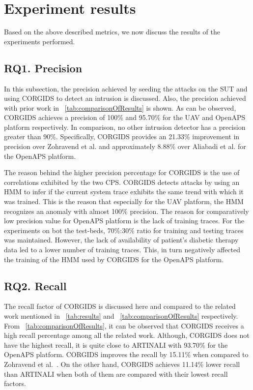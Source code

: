 \section{Experiment results} 
Based on the above described metrics, we now discuss the results of the experiments performed.

\subsection{RQ1. Precision}
In this subsection, the precision achieved by seeding the attacks on the SUT and using CORGIDS to detect an intrusion is discussed. Also,  the precision achieved with prior work in  ~\autoref{tab:comparisonOfResults} is shown. As can be observed, CORGIDS achieves a precision of 100\% and 95.70\% for the UAV and OpenAPS platform respectively. In comparison, no other intrusion detector has a precision greater than 90\%. Specifically, CORGIDS provides an 21.33\% improvement in precision over Zohravend et al. \cite{zohrevand2016hidden} and approximately 8.88\% over Aliabadi et al. \cite{aliabadi2017artinali} for the OpenAPS platform.

The reason behind the higher precision percentage for CORGIDS is the use of correlations exhibited by the two CPS. CORGIDS detects attacks by using an HMM to infer if the current system trace exhibits the same trend with which it was trained. This is the reason that especially for the UAV platform, the HMM recognizes an anomaly with almost 100\% precision. The reason for comparatively low precision value for OpenAPS platform is the lack of training traces. For the experiments on bot the test-beds, 70\%:30\% ratio for training and testing traces was maintained. However, the lack of availability of patient's diabetic therapy data led to a lower number of training traces. This, in turn negatively affected the training of the HMM used by CORGIDS for the OpenAPS platform.

\subsection{RQ2. Recall}
The recall factor of CORGIDS is discussed here and compared to the related work mentioned in ~\autoref{tab:results} and ~\autoref{tab:comparisonOfResults} respectively. From  ~\autoref{tab:comparisonOfResults}, it can be observed that CORGIDS receives a high recall percentage among all the related work. Although, CORGIDS does not have the highest recall, it is quite close to ARTINALI with 93.70\% for the OpenAPS platform. CORGIDS improves the recall by 15.11\% when compared to  Zohravend et al.~\cite{zohrevand2016hidden}. On the other hand, CORGIDS achieves 11.14\% lower recall than ARTINALI when both of them are compared with their lowest recall factors. 

